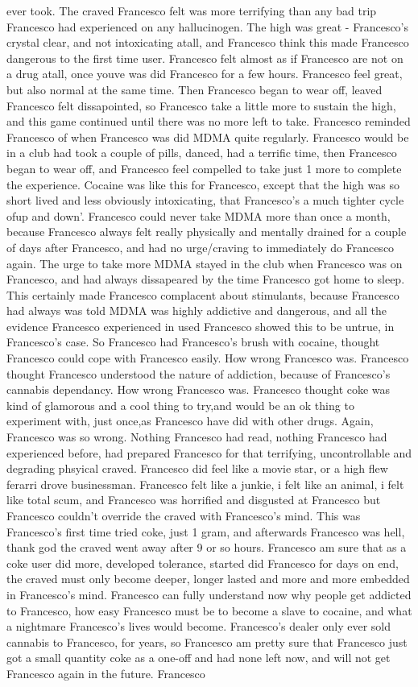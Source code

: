 \documentclass[12pt]{book}
\begin{document}
ever took. The craved Francesco felt was more terrifying than any bad trip Francesco had experienced on any hallucinogen. The high was great - Francesco's crystal clear, and not intoxicating atall, and Francesco think this made Francesco dangerous to the first time user. Francesco felt almost as if Francesco are not on a drug atall, once youve was did Francesco for a few hours. Francesco feel great, but also normal at the same time. Then Francesco began to wear off, leaved Francesco felt dissapointed, so Francesco take a little more to sustain the high, and this game continued until there was no more left to take. Francesco reminded Francesco of when Francesco was did MDMA quite regularly. Francesco would be in a club had took a couple of pills, danced, had a terrific time, then Francesco began to wear off, and Francesco feel compelled to take just 1 more to complete the experience. Cocaine was like this for Francesco, except that the high was so short lived and less obviously intoxicating, that Francesco's a much tighter cycle ofup and down'. Francesco could never take MDMA more than once a month, because Francesco always felt really physically and mentally drained for a couple of days after Francesco, and had no urge/craving to immediately do Francesco again. The urge to take more MDMA stayed in the club when Francesco was on Francesco, and had always dissapeared by the time Francesco got home to sleep. This certainly made Francesco complacent about stimulants, because Francesco had always was told MDMA was highly addictive and dangerous, and all the evidence Francesco experienced in used Francesco showed this to be untrue, in Francesco's case. So Francesco had Francesco's brush with cocaine, thought Francesco could cope with Francesco easily. How wrong Francesco was. Francesco thought Francesco understood the nature of addiction, because of Francesco's cannabis dependancy. How wrong Francesco was. Francesco thought coke was kind of glamorous and a cool thing to try,and would be an ok thing to experiment with, just once,as Francesco have did with other drugs. Again, Francesco was so wrong. Nothing Francesco had read, nothing Francesco had experienced before, had prepared Francesco for that terrifying, uncontrollable and degrading phsyical craved. Francesco did feel like a movie star, or a high flew ferarri drove businessman. Francesco felt like a junkie, i felt like an animal, i felt like total scum, and Francesco was horrified and disgusted at Francesco but Francesco couldn't override the craved with Francesco's mind. This was Francesco's first time tried coke, just 1 gram, and afterwards Francesco was hell, thank god the craved went away after 9 or so hours. Francesco am sure that as a coke user did more, developed tolerance, started did Francesco for days on end, the craved must only become deeper, longer lasted and more and more embedded in Francesco's mind. Francesco can fully understand now why people get addicted to Francesco, how easy Francesco must be to become a slave to cocaine, and what a nightmare Francesco's lives would become. Francesco's dealer only ever sold cannabis to Francesco, for years, so Francesco am pretty sure that Francesco just got a small quantity coke as a one-off and had none left now, and will not get Francesco again in the future. Francesco 
\end{document}
